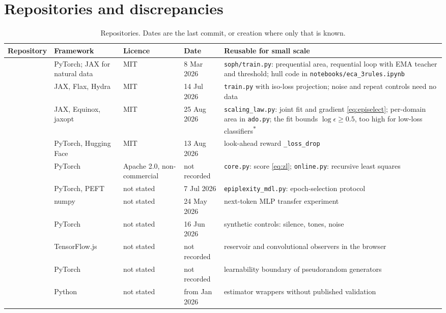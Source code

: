 \documentclass[11pt]{article}
\newcommand{\od}{\textsuperscript{$\ast$}}
\theoremstyle{tight}
\begin{document}
\section{Repositories and discrepancies}\label{sec:repos}
\begin{table}[!htb]
\centering\footnotesize
\caption{Repositories. Dates are the last commit, or creation where only that is known.}\label{tab:repos}
\begin{tabularx}{\textwidth}{@{}P{3.4cm}P{2.3cm}P{1.8cm}P{1.8cm}L@{}}
\toprule
Repository & Framework & Licence & Date & Reusable for small scale \\
\midrule
\citet{epiplexitycode} & PyTorch; JAX for natural data & MIT & 8 Mar 2026 & \texttt{soph/train.py}: prequential area, requential loop with EMA teacher and threshold; hull code in \texttt{notebooks/eca\_3rules.ipynb} \\
\citet{requentialcode} & JAX, Flax, Hydra & MIT & 14 Jul 2026 & \texttt{train.py} with iso-loss projection; noise and repeat controls need no data \\
\citet{episelectcode} & JAX, Equinox, jaxopt & MIT & 25 Aug 2026 & \texttt{scaling\_law.py}: joint fit and gradient \eqref{eq:episelect}; per-domain area in \texttt{ado.py}; the fit bounds $\log\epsilon\ge0.5$, too high for low-loss classifiers\od \\
\citet{epigencode} & PyTorch, Hugging Face & MIT & 13 Aug 2026 & look-ahead reward \texttt{\_loss\_drop} \\
\citet{learnablenoveltycode} & PyTorch & Apache 2.0, non-commercial & not recorded & \texttt{core.py}: score \eqref{eq:zl}; \texttt{online.py}: recursive least squares \\
\citet{selfplaycode} & PyTorch, PEFT & not stated & 7 Jul 2026 & \texttt{epiplexity\_mdl.py}: epoch-selection protocol \\
\citet{bossmanlab} & numpy & not stated & 24 May 2026 & next-token MLP transfer experiment \\
\citet{edirentaudio} & PyTorch & not stated & 16 Jun 2026 & synthetic controls: silence, tones, noise \\
\citet{lcrhepiplexity} & TensorFlow.js & not stated & not recorded & reservoir and convolutional observers in the browser \\
\citet{lmxxfprng} & PyTorch & not stated & not recorded & learnability boundary of pseudorandom generators \\
\citet{richardscottoz,taiyou,tunedorg} & Python & not stated & from Jan 2026 & estimator wrappers without published validation \\
\bottomrule
\end{tabularx}
\end{table}
\end{document}
